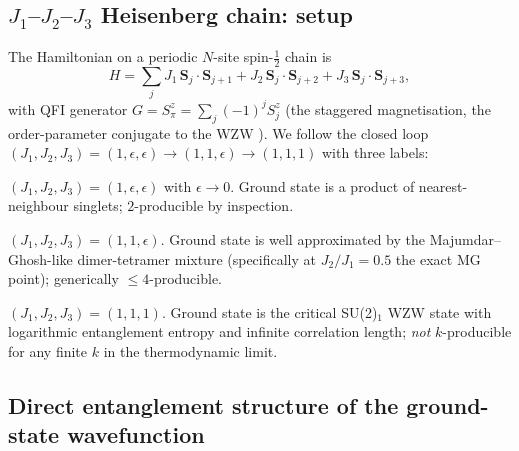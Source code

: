 \documentclass[11pt,a4paper]{article}
\begin{document}
\subsection{$J_1$--$J_2$--$J_3$ Heisenberg chain: setup}
\label{sec:j123}

The Hamiltonian on a periodic $N$-site spin-$\tfrac12$ chain is
\begin{equation}
   H=\sum_jJ_1\,\mathbf S_j\!\cdot\!\mathbf S_{j+1}
        +J_2\,\mathbf S_j\!\cdot\!\mathbf S_{j+2}
        +J_3\,\mathbf S_j\!\cdot\!\mathbf S_{j+3},
   \label{eq:H_J123}
\end{equation}
with QFI generator $G=S^z_\pi=\sum_j(-1)^jS^z_j$ (the staggered
magnetisation, the order-parameter conjugate to the WZW
\cite{Affleck1986,GogolinBook}).  We follow the closed loop
$(J_1,J_2,J_3)=(1,\epsilon,\epsilon)\to(1,1,\epsilon)\to(1,1,1)$
with three labels:

\begin{description}[leftmargin=2em]
\item[(D) Dimer.] $(J_1,J_2,J_3)=(1,\epsilon,\epsilon)$ with
$\epsilon\to0$.  Ground state is a product of nearest-neighbour
singlets; $2$-producible by inspection.
\item[(C) Cluster.] $(J_1,J_2,J_3)=(1,1,\epsilon)$.  Ground state
is well approximated by the Majumdar--Ghosh-like dimer-tetramer
mixture (specifically at $J_2/J_1=0.5$ the exact MG point);
generically $\le4$-producible.
\item[(U) Uniform.] $(J_1,J_2,J_3)=(1,1,1)$.  Ground state is the
critical SU(2)$_1$ WZW state with logarithmic entanglement entropy
and infinite correlation length; \emph{not} $k$-producible for any
finite $k$ in the thermodynamic limit.
\end{description}

\subsection{Direct entanglement structure of the ground-state
wavefunction}
\label{sec:wf_entanglement}
\end{document}
